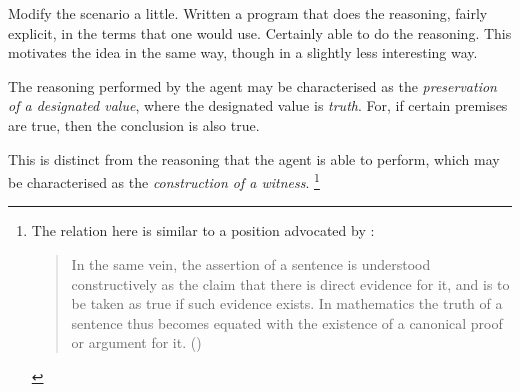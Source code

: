 \documentclass[10pt]{article}
\begin{document}
\begin{note}
  Modify the scenario a little.
  Written a program that does the reasoning, fairly explicit, in the terms that one would use.
  Certainly able to do the reasoning.
  This motivates the idea in the same way, though in a slightly less interesting way.
\end{note}


\begin{note}

  The reasoning performed by the agent may be characterised as the \emph{preservation of a designated value}, where the designated value is \emph{truth}.
  For, if certain premises are true, then the conclusion is also true.

  This is distinct from the reasoning that the agent is able to perform, which may be characterised as the \emph{construction of a witness}.\nolinebreak
  \footnote{
    The relation here is similar to a position advocated by \citeauthor{Prawitz:2005aa}:
    \begin{quote}
      In the same vein, the assertion of a sentence is understood constructively as the claim that there is direct evidence for it, and is to be taken as true if such evidence exists.
      In mathematics the truth of a sentence thus becomes equated with the existence of a canonical proof or argument for it.\nolinebreak
      \mbox{}\hfill\mbox{(\citeauthor[692]{Prawitz:2005aa})}
    \end{quote}

}
\end{note}
\end{document}
